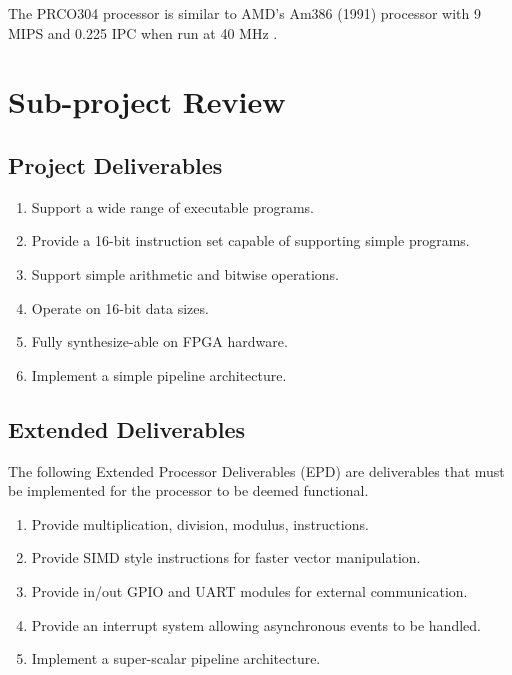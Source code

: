 \documentclass[11pt,a4paper]{report}
\newcommand{\scname}{PRCO304}
\begin{document}
The \scname{} processor is similar to AMD's Am386 (1991) processor with 9 MIPS and 0.225 IPC when run at 40 MHz \citep{am386}.


\newpage
\section{Sub-project Review}
\subsection{Project Deliverables}
\begin{enumerate}[label=\bfseries CPD\arabic*.]
\item{Support a wide range of executable programs.}
\item{Provide a 16-bit instruction set capable of supporting simple programs.}
\item{Support simple arithmetic and bitwise operations.}
\item{Operate on 16-bit data sizes.}
\item{Fully synthesize-able on FPGA hardware.}
\item{Implement a simple pipeline architecture.}
\end{enumerate}

\subsection{Extended Deliverables}
The following Extended Processor Deliverables (EPD) are deliverables that must be implemented for the processor to be deemed functional.
\begin{enumerate}[label=\bfseries EPD\arabic*.]
\item{Provide multiplication, division, modulus, instructions.}
\item{Provide SIMD style instructions for faster vector manipulation.}
\item{Provide in/out GPIO and UART modules for external communication.}
\item{Provide an interrupt system allowing asynchronous events to be handled.}
\item{Implement a super-scalar pipeline architecture.}
\end{enumerate}
\end{document}

